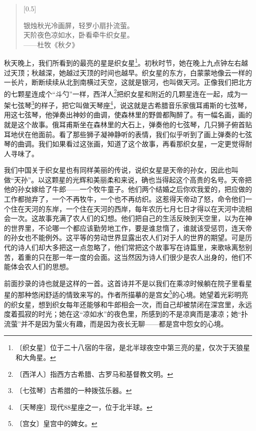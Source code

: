 \documentclass[12pt,UTF-8,openany]{ctexbook}
\begin{document}
\begin{normalsize}
    
    \begin{verse}[0.5\textwidth]
    
    银烛秋光冷画屏，轻罗小扇扑流萤。\\天阶夜色凉如水，卧看牵牛织女星。\\——杜牧《秋夕》
    
    \end{verse}
    
    秋天晚上，我们所看到的最亮的星是织女星\footnote{〔织女星〕位于二十八宿的牛宿，是北半球夜空中第三亮的星，仅次于天狼星和大角星。}。初秋时节，她在晚上九点钟左右越过天顶；秋越深，她越过天顶的时间也越早。织女星的东方，白蒙蒙地像云一样的一长片，断断续续从北到南横过天空，这就是银河，也叫做天河。正像我们把北方的七颗星连成个“斗勺”一样，西洋人\footnote{〔西洋人〕指西方古希腊、古罗马和基督教文明。}把织女星和附近的几颗星连在一起，成为一架七弦琴\footnote{〔七弦琴〕古希腊的一种拨弦乐器。}的样子，把它叫做天琴座\footnote{〔天琴座〕现代88星座之一，位于北半球。}，说这就是古希腊音乐家俄耳甫斯的七弦琴，用这七弦琴，他弹奏出神妙的曲调，使森林里的野兽都陶醉了。有一幅名画，画的就是这个故事。俄耳甫斯坐在森林里的大石上，弹奏他的七弦琴，几只狮子俯首贴耳地伏在他面前。看了那些狮子凝神静听的表情，我们似乎听到了画上弹奏的七弦琴的曲调。我们如果看过这张画，知道了这个故事，再看那织女星，一定更觉得耐人寻味了。
    
    我们中国关于织女星也有同样美丽的传说，说织女星是天帝的孙女，因此也叫做“天孙”。以这颗星的光辉和美丽柔和来说，确也当得起这个高贵的名号。天帝把他的孙女嫁给了牛郎——一个牧牛童子。他们两个结婚之后你欢我爱的，把应做的工作都抛弃了，一个不再牧牛，一个也不再纺织。这惹得天帝动了怒，命令他们一个住在天河的东岸，一个住在天河的西岸，每年农历七月七日才得以在天河中流相会一次。这故事充满了农人们的幻想。他们把自己的生活反映到天空里，以为在神的世界里，不论哪一个都应该勤劳地工作，要是谁怠惰了，谁就该受惩罚，连天帝的孙女也不能例外。这平等的劳动世界显露出农人们对于人的世界的期望。可是历代的诗人们却大多把这一点忽略了，他们常把这个故事写在诗篇里，来歌咏离愁别苦，着重的只在那一年一度的会面。这当然因为诗人们很少是农人出身的，他们不能体会农人们的思想。
    
    前面抄录的诗也就是这样的一首。这首诗并不是以我们在乘凉时候躺在院子里看星星的那种悠闲舒适的情致来写的。作者所描摹的是宫女\footnote{〔宫女〕皇宫中的婢女。}的心境。她望着光彩明亮的织女星，想到织女每年还能够和牛郎相会一次，而自己却被禁闭在深宫里，永远度着孤寂的时光；她在这“凉如水”的夜色里，所感到的不是凉爽而是凄凉；她“扑流萤”并不是因为萤火有趣，而是因为夜长无聊——都是宫中怨女的心境。
    

\end{normalsize}
\end{document}
